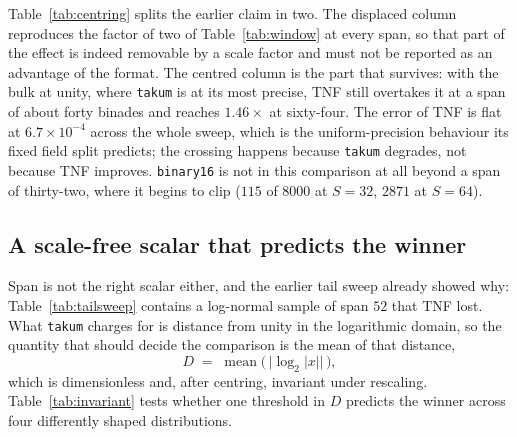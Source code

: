 \documentclass[11pt]{article}
\theoremstyle{definition}
\begin{document}
Table~\ref{tab:centring} splits the earlier claim in two. The displaced column
reproduces the factor of two of Table~\ref{tab:window} at every span, so that part
of the effect is indeed removable by a scale factor and must not be reported as an
advantage of the format. The centred column is the part that survives: with the
bulk at unity, where \texttt{takum} is at its most precise, TNF still overtakes it
at a span of about forty binades and reaches $1.46\times$ at sixty-four. The
error of TNF is flat at $6.7\times 10^{-4}$ across the whole sweep, which is the
uniform-precision behaviour its fixed field split predicts; the crossing happens
because \texttt{takum} degrades, not because TNF improves. \texttt{binary16} is
not in this comparison at all beyond a span of thirty-two, where it begins to clip
($115$ of $8000$ at $S=32$, $2871$ at $S=64$).

\subsection{A scale-free scalar that predicts the winner}
\label{sec:invariant}

Span is not the right scalar either, and the earlier tail sweep already showed why:
Table~\ref{tab:tailsweep} contains a log-normal sample of span $52$ that TNF lost.
What \texttt{takum} charges for is distance from unity in the logarithmic domain,
so the quantity that should decide the comparison is the mean of that distance,
\[
  D \;=\; \operatorname{mean}\bigl(\,\bigl\lvert \log_2 |x| \bigr\rvert\,\bigr),
\]
which is dimensionless and, after centring, invariant under rescaling.
Table~\ref{tab:invariant} tests whether one threshold in $D$ predicts the winner
across four differently shaped distributions.
\end{document}

